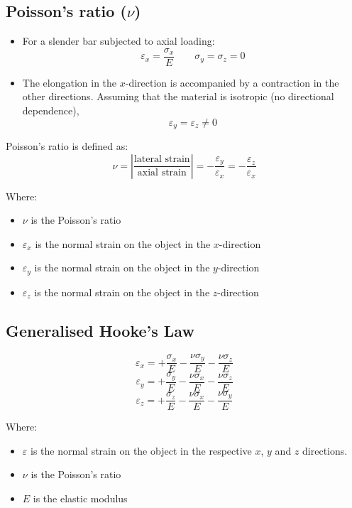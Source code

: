 \documentclass[11pt]{article}
\begin{document}
\newpage

\subsection{Poisson's ratio (\(\nu\))}
\label{sec:orgc4aef2f}
\begin{itemize}
\item For a slender bar subjected to axial loading:
\[\varepsilon_x = \frac{\sigma_x}{E} \qquad \sigma_y = \sigma_z = 0\]

\item The elongation in the \(x\)-direction is accompanied by a contraction in the other directions. Assuming that the material is isotropic (no directional dependence),
\[\varepsilon_y = \varepsilon_z \ne 0\]
\end{itemize}

Poisson's ratio is defined as:
\[\nu = \left| \frac{\text{lateral strain}}{\text{axial strain}} \right| = - \frac{\varepsilon_y}{\varepsilon_x} = - \frac{\varepsilon_z}{\varepsilon_x}\]

Where:
\begin{itemize}
\item \(\nu\) is the Poisson's ratio
\item \(\varepsilon_x\) is the normal strain on the object in the \(x\)-direction
\item \(\varepsilon_y\) is the normal strain on the object in the \(y\)-direction
\item \(\varepsilon_z\) is the normal strain on the object in the \(z\)-direction
\end{itemize}

\subsection{Generalised Hooke's Law}
\label{sec:orgbf3a5a2}
\[\varepsilon_x = + \frac{\sigma_x}{E} - \frac{\nu \sigma_y}{E} - \frac{\nu \sigma_z}{E}\]
\[\varepsilon_y = + \frac{\sigma_y}{E} - \frac{\nu \sigma_x}{E} - \frac{\nu \sigma_z}{E}\]
\[\varepsilon_z = + \frac{\sigma_z}{E} - \frac{\nu \sigma_x}{E} - \frac{\nu \sigma_y}{E}\]

Where:
\begin{itemize}
\item \(\varepsilon\) is the normal strain on the object in the respective \(x\), \(y\) and \(z\) directions.
\item \(\nu\) is the Poisson's ratio
\item \(E\) is the elastic modulus
\end{itemize}
\end{document}
